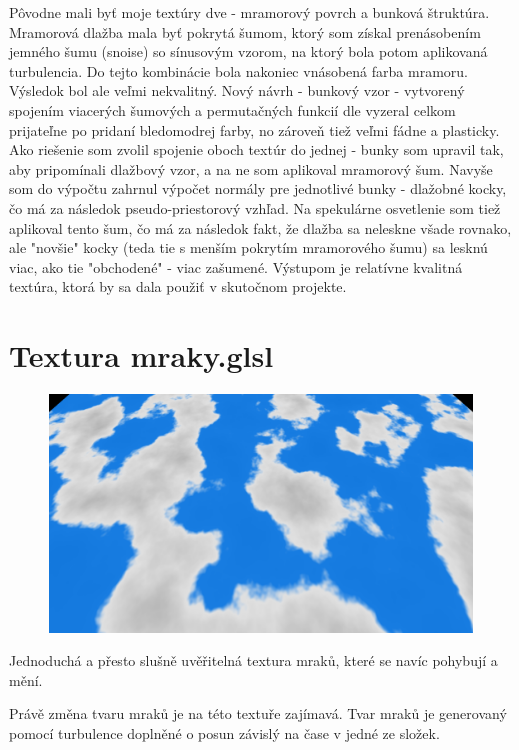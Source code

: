 \documentclass[12pt,a4paper,titlepage,final]{report}
\begin{document}
Pôvodne mali byť moje textúry dve - mramorový povrch a bunková štruktúra. Mramorová dlažba mala byť pokrytá šumom, ktorý som získal prenásobením jemného šumu (snoise) so sínusovým vzorom, na ktorý bola potom aplikovaná turbulencia. Do tejto kombinácie bola nakoniec vnásobená farba mramoru. Výsledok bol ale veľmi nekvalitný. Nový návrh - bunkový vzor - vytvorený spojením viacerých šumových a permutačných funkcií dle \cite{gustavson2014} vyzeral celkom prijateľne po pridaní bledomodrej farby, no zároveň tiež veľmi fádne a plasticky. Ako riešenie som zvolil spojenie oboch textúr do jednej - bunky som upravil tak, aby pripomínali dlažbový vzor, a na ne som aplikoval mramorový šum. Navyše som do výpočtu zahrnul výpočet normály pre jednotlivé bunky - dlažobné kocky, čo má za následok pseudo-priestorový vzhľad. Na spekulárne osvetlenie som tiež aplikoval tento šum, čo má za následok fakt, že dlažba sa neleskne všade rovnako, ale "novšie" kocky (teda tie s menším pokrytím mramorového šumu) sa lesknú viac, ako tie "obchodené" - viac zašumené. Výstupom je relatívne kvalitná textúra, ktorá by sa dala použiť v skutočnom projekte.

\section{Textura mraky.glsl}
\begin{figure}[h]
	\captionsetup{type=figure}
	\includegraphics[width=\textwidth]{images/mraky.png}
\end{figure}

Jednoduchá a přesto slušně uvěřitelná textura mraků, které se navíc pohybují a mění. 

Právě změna tvaru mraků je  na této textuře zajímavá. Tvar mraků je generovaný pomocí turbulence doplněné o posun závislý na čase v jedné ze složek.
  
\end{document}
